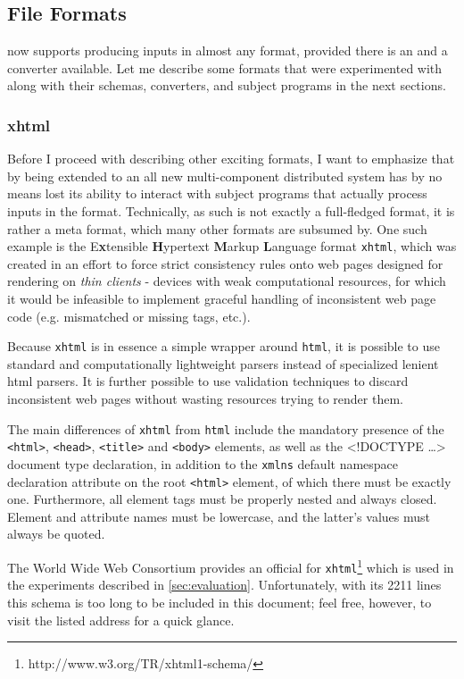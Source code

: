 \subsection{File Formats}
\xmlmate now supports producing inputs in almost any format, provided there is an \xsd and a converter
available. Let me describe some formats that were experimented with along with their schemas, converters, and
subject programs in the next sections.
\subsubsection{xhtml}
Before I proceed with describing other exciting formats, I want to emphasize that by being extended to an all
new multi-component distributed system \xmlmate has by no means lost its ability to interact with subject
programs that actually process inputs in the \xml format. Technically, \xml as such is not exactly a
full-fledged format, it is rather a meta format, which many other formats are subsumed by. One
such example is the E\textbf{x}tensible \textbf{H}ypertext \textbf{M}arkup \textbf{L}anguage format
\texttt{xhtml}, which was created in an effort to force strict consistency rules onto web pages designed for
rendering on \emph{thin clients} - devices with weak computational resources, for which it would be infeasible
to implement graceful handling of inconsistent web page code (e.g. mismatched or missing tags, etc.). 
 
Because \texttt{xhtml} is in essence a simple \xml wrapper around \texttt{html}, it is possible to use standard
and computationally lightweight \xml parsers instead of specialized lenient html parsers. It is further
possible to use \xml validation techniques to discard inconsistent web pages without wasting resources trying
to render them.

The main differences of \texttt{xhtml} from \texttt{html} include the mandatory presence of the
\texttt{<html>}, \texttt{<head>}, \texttt{<title>} and \texttt{<body>} elements, as well as the {\small
<!DOCTYPE \ldots>} document type declaration, in addition to the \texttt{xmlns} default namespace declaration
attribute on the root \texttt{<html>} element, of which there must be exactly one. Furthermore, all element
tags must be properly nested and always closed. Element and attribute names must be lowercase, and the
latter's values must always be quoted.

The World Wide Web Consortium provides an official \xsd for
\texttt{xhtml}\footnote{http://www.w3.org/TR/xhtml1-schema/} which is used in the \xmlmate experiments
described in \cref{sec:evaluation}. Unfortunately, with its 2211 lines this schema is too long to be included
in this document; feel free, however, to visit the listed address for a quick glance.

